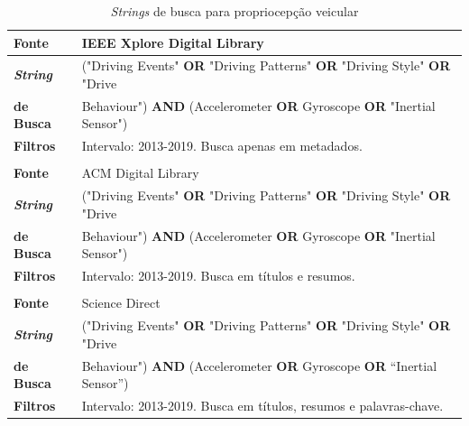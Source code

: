 \begin{table}[h!]
    \caption{\textit{Strings} de busca para propriocepção veicular}
    \label{tabela:propriocepcao_busca}
    \centering
    \small
    \begin{tabular}{l l}
        
        \toprule
        \textbf{Fonte} & IEEE Xplore Digital Library \\
        \toprule
        \textbf{\textit{String}} & ("Driving Events" \textbf{ OR} "Driving Patterns" \textbf{ OR} "Driving Style" \textbf{ OR} "Drive \\ \textbf{de Busca} & Behaviour") \textbf{AND} (Accelerometer \textbf{OR} Gyroscope \textbf{OR} "Inertial Sensor") \\
        \toprule
        \textbf{Filtros} & Intervalo: 2013-2019. Busca apenas em metadados. \\
        \bottomrule
        
        \\
        
        \toprule
        \textbf{Fonte} & ACM Digital Library \\
        \toprule
        \textbf{\textit{String}} & ("Driving Events" \textbf{ OR} "Driving Patterns" \textbf{ OR} "Driving Style" \textbf{ OR} "Drive \\ \textbf{de Busca} & Behaviour")   \textbf{AND} (Accelerometer \textbf{OR} Gyroscope \textbf{OR} "Inertial Sensor") \\
        \toprule
        \textbf{Filtros} & Intervalo: 2013-2019.  Busca em títulos e resumos. \\
        \bottomrule
         
         \\
         
        \toprule
        \textbf{Fonte} & Science Direct \\
        \toprule
        \textbf{\textit{String}} & ("Driving Events"  \textbf{ OR} "Driving Patterns" \textbf{ OR} "Driving Style" \textbf{ OR}  "Drive \\ \textbf{de Busca} & Behaviour")  \textbf{AND} (Accelerometer \textbf{OR} Gyroscope \textbf{OR} “Inertial Sensor”) \\
        \toprule
        \textbf{Filtros} & Intervalo: 2013-2019. Busca em títulos, resumos e palavras-chave. \\
        \bottomrule
        
    \end{tabular}
\end{table}

